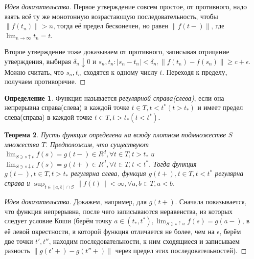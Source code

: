 \documentclass[16pt]{article}
\newtheorem{theorem}{Теорема}[section]
\theoremstyle{definition}
\newtheorem{definition}[theorem]{Определение}
\begin{document}
\begin{proof}[Идея доказательства]
Первое утверждение совсем простое, от противного, надо взять всё ту же монотонную возрастающую последовательность, чтобы $\|f(t_n)\| > n$, тогда её предел бесконечен, но равен $\|f(t-)\|$, где $\lim_{n \rightarrow \infty} t_n = t$.

Второе утверждение тоже доказываем от противного, записывая отрицание утверждения, выбирая $\delta_n \downarrow 0$ и $s_n, t_n : |s_n - t_n| < \delta_n, \|f(t_n) - f(s_n)\| \ge c + \epsilon$. Можно считать, что $s_n, t_n$ сходятся к одному числу $t$. Переходя к пределу, получаем противоречие.
\end{proof}
\begin{definition}
Функция называется \textit{регулярной справа(слева)}, если она непрерывна справа(слева) в каждой точке $t \in T, t < t^* (t > t_*)$ и имеет предел слева(справа) в каждой точке $t \in T, t > t_* (t < t^*)$. 
\end{definition}
\begin{theorem}
Пусть функция определена на всюду плотном подмножестве $S$ множества $T$. Предположим, что существуют $\lim_{S \ni s \uparrow t} f(s) = g(t-) \in R^d, \forall t \in T, t > t_*$ и $\lim_{S \ni s \downarrow t} f(s) = g(t+) \in R^d, \forall t \in T, t < t^*$. Тогда функция $g(t-), t \in T, t > t_*$ регулярна слева, функция $g(t+), t \in T, t < t^*$ регулярна справа и $\sup_{t \in [a, b] \cap S} \|f(t)\| < \infty, \forall a, b \in T, a < b$.
\end{theorem}
\begin{proof}[Идея доказательства]
Докажем, например, для $g(t+)$. Сначала показывается, что функция непрерывна, после чего записываются неравенства, из которых следует условие Коши (берём точку $a \in (t_*, t^*), \lim_{S \ni s \uparrow a}f(s) = g(a-)$, в её левой окрестности, в которой функция отличается не более, чем на $\epsilon$, берём две точки $t', t''$, находим последовательности, к ним сходящиеся и записываем разность $\|g(t'+) - g(t''+)\|$ через предел этих последовательностей).
\end{proof}
\end{document}
